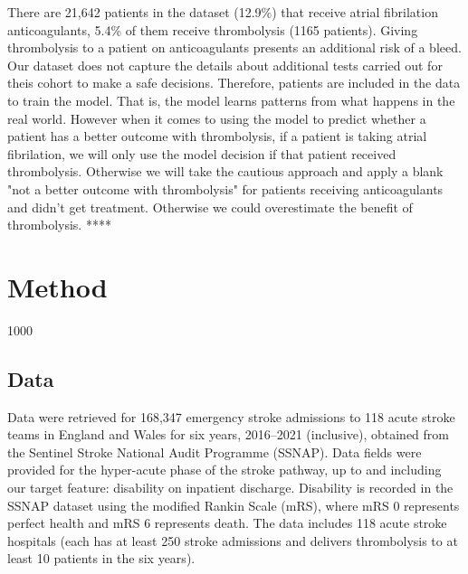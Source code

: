 There are 21,642 patients in the dataset (12.9\%) that receive atrial fibrilation anticoagulants, 5.4\% of them receive thrombolysis (1165 patients). Giving thrombolysis to a patient on anticoagulants presents an additional risk of a bleed. Our dataset does not capture the details about additional tests carried out for theis cohort to make a safe decisions. Therefore, patients are included in the data to train the model. That is, the model learns patterns from what happens in the real world. However when it comes to using the model to predict whether a patient has a better outcome with thrombolysis, if a patient is taking atrial fibrilation, we will only use the model decision if that patient received thrombolysis. Otherwise we will take the cautious approach and apply a blank "not a better outcome with thrombolysis" for patients receiving anticoagulants and didn't get treatment. Otherwise we could overestimate the benefit of thrombolysis.
****

\section{Method} 1000

\subsection{Data}

Data were retrieved for 168,347 emergency stroke admissions to 118 acute stroke teams in England and Wales for six years, 2016–2021 (inclusive), obtained from the Sentinel Stroke National Audit Programme (SSNAP). Data fields were provided for the hyper-acute phase of the stroke pathway, up to and including our target feature: disability on inpatient discharge. Disability is recorded in the SSNAP dataset using the modified Rankin Scale (mRS), where mRS 0 represents perfect health and mRS 6 represents death. The data includes 118 acute stroke hospitals (each has at least 250 stroke admissions and delivers thrombolysis to at least 10 patients in the six years).

